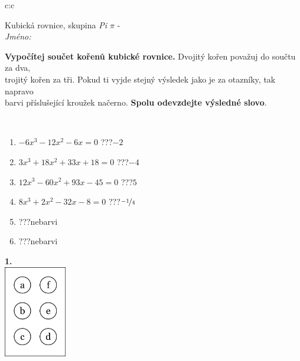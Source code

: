 \documentclass[10pt]{report}
\begin{document}
\begin{tabular}{c:c}
\begin{minipage}[c][104.5mm][t]{0.5\linewidth}
\begin{center}
\vspace{7mm}
{\huge Kubická rovnice, skupina \textit{Pi $\pi$} -}\\[5mm]
\textit{Jméno:}\phantom{xxxxxxxxxxxxxxxxxxxxxxxxxxxxxxxxxxxxxxxxxxxxxxxxxxxxxxxxxxxxxxxxx}\\[5mm]
\begin{minipage}{0.95\linewidth}
\begin{center}
\textbf{Vypočítej součet kořenů kubické rovnice.} Dvojitý kořen považuj do součtu za dva,\\trojitý kořen za tři. Pokud ti vyjde stejný výsledek jako je za otazníky, tak napravo\\barvi příslušející kroužek načerno. \textbf{Spolu odevzdejte výsledné slovo}.
\end{center}
\end{minipage}
\\[1mm]
\begin{minipage}{0.79\linewidth}
\begin{center}
\begin{varwidth}{\linewidth}
\begin{enumerate}
\Large
\item $-6x^3-12x^2-6x=0$\quad \dotfill\; ???\;\dotfill \quad $-2$
\item $3x^3+18x^2+33x+18=0$\quad \dotfill\; ???\;\dotfill \quad $-4$
\item $12x^3-60x^2+93x-45=0$\quad \dotfill\; ???\;\dotfill \quad $5$
\item $8x^3+2x^2-32x-8=0$\quad \dotfill\; ???\;\dotfill \quad $\nicefrac{-1}{4}$
\item \quad \dotfill\; ???\;\dotfill \quad nebarvi
\item \quad \dotfill\; ???\;\dotfill \quad nebarvi
\end{enumerate}
\end{varwidth}
\end{center}
\end{minipage}
\begin{minipage}{0.20\linewidth}
\begin{center}
{\Huge\bfseries 1.} \\[2mm]
\includegraphics[height=40mm]{../images/braille.png}

\end{center}
\end{minipage}
\end{center}
\end{minipage}
\end{tabular}
\end{document}
